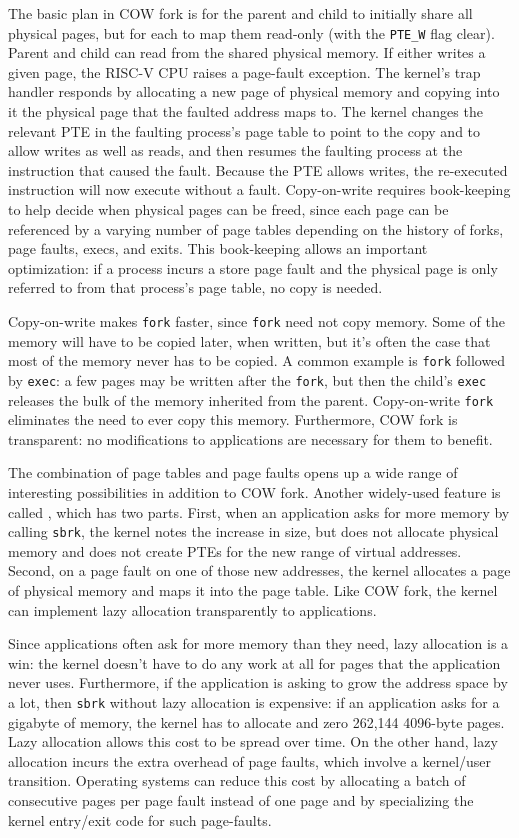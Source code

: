 The basic plan in COW fork is for the parent and child to initially
share all physical pages, but for each to map them read-only (with the
\lstinline{PTE_W} flag clear).
Parent and child can read from the shared physical memory.
If either writes a given page,
the RISC-V CPU raises a page-fault exception.
The kernel's trap handler responds by allocating a
new page of physical memory and copying into it
the physical page that the faulted address maps to.
The kernel changes the relevant PTE in the faulting process's page
table to point to the copy and to allow writes as well as reads,
and then resumes the faulting
process at the instruction that caused the fault. Because the 
PTE allows writes, the re-executed instruction
will now execute without a fault. Copy-on-write requires book-keeping
to help decide when physical pages can be freed, since each page can
be referenced by a varying number of page tables depending on the history of
forks, page faults, execs, and exits. This book-keeping allows
an important optimization: if a process incurs a store page
fault and the physical page is only referred to from that process's
page table, no copy is needed.

Copy-on-write makes \lstinline{fork} faster, since \lstinline{fork}
need not copy memory. Some of the memory will have to be copied
later, when written, but it's often the case that most of the
memory never has to be copied.
A common example is
\lstinline{fork} followed by \lstinline{exec}:
a few pages may be written after the \lstinline{fork},
but then the child's \lstinline{exec} releases
the bulk of the memory inherited from the parent.
Copy-on-write \lstinline{fork} eliminates the need to
ever copy this memory.
Furthermore, COW fork is transparent:
no modifications to applications are necessary for
them to benefit.

The combination of page tables and page faults opens up a wide range
of interesting possibilities in addition to COW fork.  Another
widely-used feature is called , which has
two parts.  First, when an application asks for more memory by calling
\lstinline{sbrk}, the kernel notes the increase in size, but does not
allocate physical memory and does not create PTEs for the new range of
virtual addresses.  Second, on a page fault on one of those new
addresses, the kernel allocates a page of physical memory and maps it
into the page table.
Like COW fork,
the kernel can implement lazy allocation transparently to applications.

Since applications often ask for more memory than they need, lazy
allocation is a win: the kernel doesn't have to do any work at all
for pages that the application never uses.
Furthermore, if the application is
asking to grow the address space by a lot, then \lstinline{sbrk} 
without lazy allocation is
expensive: if an application asks for a gigabyte of memory,
the kernel has to allocate and zero 262,144 4096-byte pages.
Lazy allocation allows this cost
to be spread over time.  On the other hand, lazy allocation
incurs the extra
overhead of page faults, which involve a kernel/user transition.
Operating systems can reduce this cost by allocating a batch of 
consecutive pages per
page fault instead of one page and by specializing the kernel
entry/exit code for such page-faults.

